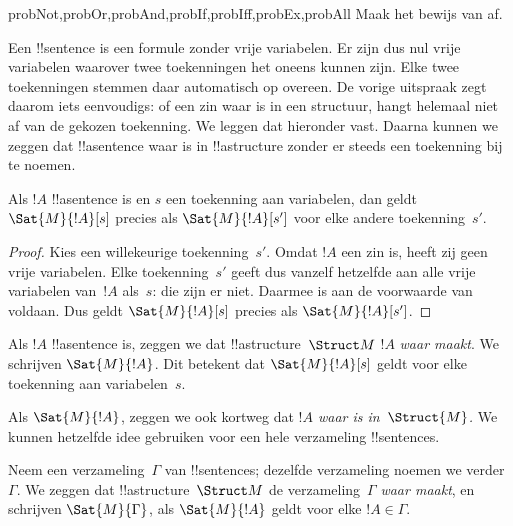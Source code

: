 \documentclass[openany]{memoir}
\begin{document}
\begin{probtag}{probNot,probOr,probAnd,probIf,probIff,probEx,probAll}
Maak het bewijs van  af.
\end{probtag}

\begin{explain}
Een !!{sentence} is een formule zonder vrije variabelen. Er zijn dus
nul vrije variabelen waarover twee toekenningen het oneens kunnen
zijn. Elke twee toekenningen stemmen daar automatisch op overeen. De
vorige uitspraak zegt daarom iets eenvoudigs: of een zin waar is in
een structuur, hangt helemaal niet af van de gekozen toekenning. We
leggen dat hieronder vast. Daarna kunnen we zeggen dat !!a{sentence}
waar is in !!a{structure} zonder er steeds een toekenning bij te noemen.
\end{explain}

\begin{cor}
Als $!A$ !!a{sentence} is en $s$ een toekenning aan variabelen, dan
geldt $\Sat{M}{!A}[s]$ precies als $\Sat{M}{!A}[s']$ voor elke andere
toekenning~$s'$.
\end{cor}

\begin{proof}
  Kies een willekeurige toekenning~$s'$. Omdat $!A$ een zin is, heeft
  zij geen vrije variabelen. Elke toekenning~$s'$ geeft dus vanzelf
  hetzelfde aan alle vrije variabelen van~$!A$ als~$s$: die zijn er
  niet. Daarmee is aan de voorwaarde van
   voldaan. Dus geldt $\Sat{M}{!A}[s]$ precies als
  $\Sat{M}{!A}[s']$.
\end{proof}

\begin{defn}
Als $!A$ !!a{sentence} is, zeggen we dat !!a{structure}~$\Struct M$
$!A$ \emph{waar maakt}. We schrijven $\Sat{M}{!A}$. Dit betekent dat
$\Sat{M}{!A}[s]$ geldt voor elke toekenning aan variabelen~$s$.
\end{defn}

Als $\Sat{M}{!A}$, zeggen we ook kortweg dat \emph{$!A$ waar is
in~$\Struct{M}$.} We kunnen hetzelfde idee gebruiken voor een hele
verzameling !!{sentence}s.

\begin{defn}
Neem een verzameling~$\Gamma$ van !!{sentence}s; dezelfde verzameling
noemen we verder~$\Gamma$. We zeggen dat !!a{structure}~$\Struct M$
de verzameling~$\Gamma$ \emph{waar maakt},
en schrijven $\Sat{M}{\Gamma}$, als $\Sat{M}{!A}$ geldt voor elke
$!A \in \Gamma$.
\end{defn}
\end{document}
